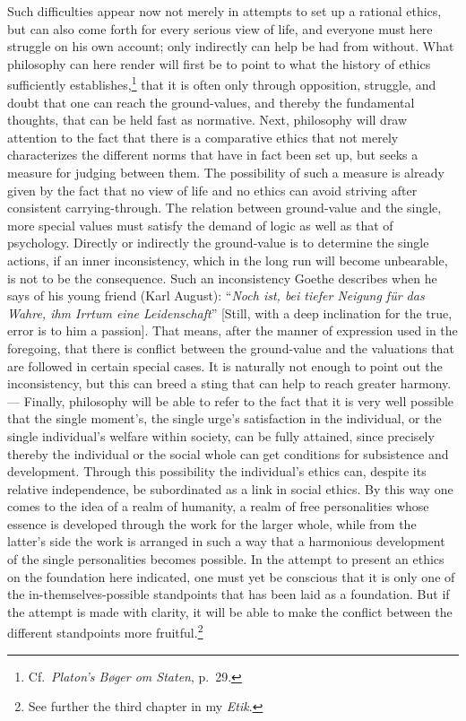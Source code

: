 \documentclass[12pt]{book}
\newcommand{\opage}[1]{\marginnote{\footnotesize\textit{[#1]}}}
\begin{document}
Such difficulties appear now not merely in attempts to set up a rational ethics, but can also come forth for every
serious view of life, and everyone must here struggle on his own account; only indirectly can help be had from without.
What philosophy can here render will first be to point to what the history of ethics sufficiently establishes,\footnote{Cf.\
\textit{Platon's Bøger om Staten}, p.\ 29.} that it is often only through opposition, struggle, and doubt that one can
reach the ground-values, and thereby the fundamental thoughts, that can be held fast as normative. Next, philosophy will
draw attention to the fact that there is a comparative ethics that not merely characterizes the different norms that have
in fact been set up, but seeks a measure for judging between them. The possibility of such a measure is already given by
the fact that no view of life and no ethics can avoid striving after consistent carrying-through. The relation between
ground-value and the single, more special values must satisfy the demand of logic as well as that of psychology. Directly
or indirectly the ground-value is to determine the single actions, if an inner inconsistency, which in the long run will
become unbearable, is not to be the consequence. Such an inconsistency Goethe describes when he says of his young friend
(Karl August): ``\textit{Noch ist, bei tiefer Neigung für das Wahre, ihm Irrtum eine Leidenschaft}'' [Still, with a deep
inclination for the true, error is to him a passion]. That means, after the manner of expression used in the foregoing,
that there is conflict between the ground-value and the valuations that are followed in certain special cases. It is
naturally not enough to \opage{80}point out the inconsistency, but this can breed a sting that can help to reach greater harmony.
--- Finally, philosophy will be able to refer to the fact that it is very well possible that the single moment's, the
single urge's satisfaction in the individual, or the single individual's welfare within society, can be fully attained,
since precisely thereby the individual or the social whole can get conditions for subsistence and development. Through
this possibility the individual's ethics can, despite its relative independence, be subordinated as a link in social
ethics. By this way one comes to the idea of a realm of humanity, a realm of free personalities whose essence is developed
through the work for the larger whole, while from the latter's side the work is arranged in such a way that a harmonious
development of the single personalities becomes possible. In the attempt to present an ethics on the foundation here
indicated, one must yet be conscious that it is only one of the in-themselves-possible standpoints that has been laid as a
foundation. But if the attempt is made with clarity, it will be able to make the conflict between the different standpoints
more fruitful.\footnote{See further the third chapter in my \textit{Etik}.}
\end{document}
